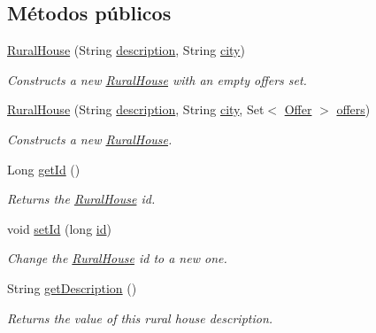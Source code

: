 \subsection*{Métodos públicos}
\begin{DoxyCompactItemize}
\item 
\mbox{\hyperlink{a00188_aa3488a4d0e876307f91f80784a5538a5}{Rural\+House}} (String \mbox{\hyperlink{a00188_a3cd460d3df936008a7c7580e87680fd4}{description}}, String \mbox{\hyperlink{a00188_a495797ff9bd294c83563790e36ec2245}{city}})
\begin{DoxyCompactList}\small\item\em Constructs a new \mbox{\hyperlink{a00188}{Rural\+House}} with an empty offers set. \end{DoxyCompactList}\item 
\mbox{\hyperlink{a00188_a7a4e2da81d0c806e058f446b4c657458}{Rural\+House}} (String \mbox{\hyperlink{a00188_a3cd460d3df936008a7c7580e87680fd4}{description}}, String \mbox{\hyperlink{a00188_a495797ff9bd294c83563790e36ec2245}{city}}, Set$<$ \mbox{\hyperlink{a00184}{Offer}} $>$ \mbox{\hyperlink{a00188_a8e07bbd638166d5d9356828a4ce09488}{offers}})
\begin{DoxyCompactList}\small\item\em Constructs a new \mbox{\hyperlink{a00188}{Rural\+House}}. \end{DoxyCompactList}\item 
Long \mbox{\hyperlink{a00188_adae53723eac123b55f8122e89cdfe9c3}{get\+Id}} ()
\begin{DoxyCompactList}\small\item\em Returns the \mbox{\hyperlink{a00188}{Rural\+House}} id. \end{DoxyCompactList}\item 
void \mbox{\hyperlink{a00188_aaea8ea8cb5cb886fb0b7e38bb7546472}{set\+Id}} (long \mbox{\hyperlink{a00188_ad9352e84ead5c4feb7eadee60570d9de}{id}})
\begin{DoxyCompactList}\small\item\em Change the \mbox{\hyperlink{a00188}{Rural\+House}} id to a new one. \end{DoxyCompactList}\item 
String \mbox{\hyperlink{a00188_a3d4f77d4ff2e8ca9527bb86816dc1174}{get\+Description}} ()
\begin{DoxyCompactList}\small\item\em Returns the value of this rural house description. \end{DoxyCompactList}\item 

\end{DoxyCompactItemize}
